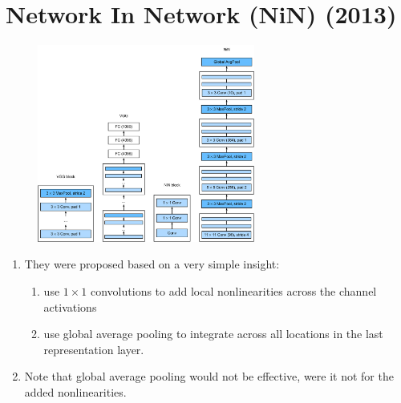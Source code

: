 \section{Network In Network (NiN) (2013) \cite{arxiv/1312.4400-nin,medium/towardsdatascience.com/review-nin-network-in-network-image-classification-69e271e499ee,dnn-1}}\label{Network In Network (NiN)}

\begin{figure}[H]
    \centering
    \includegraphics[width=\linewidth, height=6.5cm, keepaspectratio]{Pictures/convolutional-neural-network/nin.jpg}
\end{figure}


\begin{enumerate}[itemsep=0.2cm]
    \item They were proposed based on a very simple insight: 
    \begin{enumerate}
        \item use $1\times 1$ convolutions to add local nonlinearities across the channel activations 
        \item use global average pooling to integrate across all locations in the last representation layer. 
    \end{enumerate}
    
    \item Note that global average pooling would not be effective, were it not for the added nonlinearities. 

\end{enumerate}


